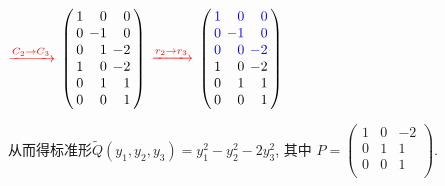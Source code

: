 \begin{frame}
{{\makebox[3cm]{ } $\red{\xrightarrow{C_2\rightarrow C_3}}$
$\setlength{\arraycolsep}{2pt} \left(\begin{array}{rrr}1&0&0\\0&-1&0\\0&1&-2\\1&0&-2\\0&1&1\\0&0&1\\\end{array}\right)$
$\red{\xrightarrow{r_2\rightarrow r_3}}$
$\setlength{\arraycolsep}{2pt} \left(\begin{array}{rrr}\blue{1}&\blue{0}&\blue{0}\\\blue{0}&\blue{-1}&\blue{0}\\\blue{0}&\blue{0}&\blue{-2}\\1&0&-2\\0&1&1\\0&0&1\\\end{array}\right)$ \pp

从而得标准形$\widetilde{Q}(y_1,y_2,y_3)=y_1^2-y_2^2-2y_3^2$, 其中
$P = \left(\begin{array}{rrr}1&0&-2\\0&1&1\\0&0&1\\\end{array}\right)$.
}}
\end{frame}





